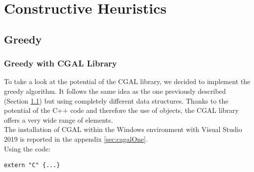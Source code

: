 \chapter{Constructive Heuristics}

\section{Greedy}\label{sec:greedy}
\subsection{Greedy with CGAL Library}
To take a look at the potential of the CGAL library, we decided to implement the greedy algorithm. It follows the same idea as the one previously described (Section \ref{sec:greedy}) but using completely different data structures. Thanks to the potential of the C++ code and therefore the use of objects, the CGAL library offers a very wide range of elements.\\ 
The installation of CGAL within the Windows environment with Visual Studio 2019 is reported in the appendix \ref{sec:cagalOne}.\\
Using the code:

\begin{lstlisting}
extern "C" {...}
\end{lstlisting}

